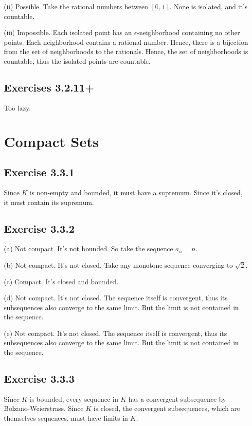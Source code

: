 \documentclass{book}
\begin{document}
\noindent
(ii)
Possible. Take the rational numbers between $[0, 1]$. None is isolated, and it's countable.

\noindent
(iii)
Impossible. Each isolated point has an $\epsilon$-neighborhood containing no other points. Each neighborhood contains a rational number. Hence, there is a bijection from the set of neighborhoods to the rationals. Hence, the set of neighborhoods is countable, thus the isolated points are countable.

\subsection*{Exercises 3.2.11+}
Too lazy.

\section{Compact Sets}

\subsection*{Exercise 3.3.1}
Since $K$ is non-empty and bounded, it must have a supremum. Since it's closed, it must contain its supremum.

\subsection*{Exercise 3.3.2}
(a)
Not compact. It's not bounded. So take the sequence $a_n = n$.

\noindent
(b)
Not compact. It's not closed. Take any monotone sequence converging to $\sqrt{2}$.

\noindent
(c)
Compact. It's closed and bounded.

\noindent
(d)
Not compact. It's not closed. The sequence itself is convergent, thus its subsequences also converge to the same limit. But the limit is not contained in the sequence.

\noindent
(e)
Not compact. It's not closed. The sequence itself is convergent, thus its subsequences also converge to the same limit. But the limit is not contained in the sequence.

\subsection*{Exercise 3.3.3}
Since $K$ is bounded, every sequence in $K$ has a convergent subsequence by Bolzano-Weierstrass. Since $K$ is closed, the convergent subsequences, which are themselves sequences, must have limits in $K$.
\end{document}
